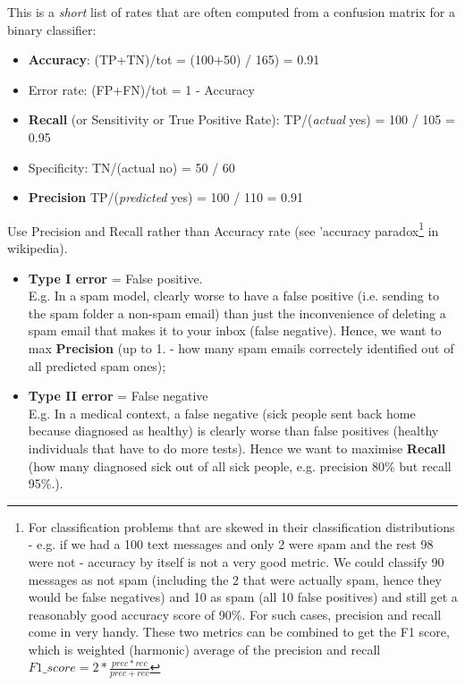 \documentclass[11pt]{article}
\begin{document}
This is a \textit{short} list of rates that are often computed from a confusion matrix for a binary classifier:
\begin{itemize}
	\item \textbf{Accuracy}: (TP+TN)/tot = (100+50) / 165) = 0.91
	\item Error rate: (FP+FN)/tot = 1 - Accuracy
	\item \textbf{Recall} (or Sensitivity or True Positive Rate): TP/(\textit{actual} yes) = 100 / 105 = 0.95
	\item Specificity: TN/(actual no) = 50 / 60
	\item \textbf{Precision} TP/(\textit{predicted} yes) = 100 / 110 = 0.91
\end{itemize}
Use Precision and Recall rather than Accuracy rate (see 'accuracy paradox\footnote{For classification problems that are skewed in their classification distributions - e.g. if we had a 100 text messages and only 2 were spam and the rest 98 were not - accuracy by itself is not a very good metric. We could classify 90 messages as not spam (including the 2 that were actually spam, hence they would be false negatives) and 10 as spam (all 10 false positives) and still get a reasonably good accuracy score of 90\%. For such cases, precision and recall come in very handy. These two metrics can be combined to get the F1 score, which is weighted (harmonic) average of the precision and recall $F1\_score = 2 * \frac{prec * rec}{prec + rec}$} in wikipedia).

\begin{itemize}
	\item \textbf{Type I error} = False positive. \\ E.g. In a spam model, clearly worse to have a false positive (i.e. sending to the spam folder a non-spam email) than just the inconvenience of deleting a spam email that makes it to your inbox (false negative). Hence, we want to max \textbf{Precision} (up to 1. - how many spam emails correctely identified out of all predicted spam ones);
	\item \textbf{Type II error} = False negative \\ E.g. In a medical context, a false negative (sick people sent back home because diagnosed as healthy) is clearly worse than false positives (healthy individuals that have to do more tests). Hence we want to maximise \textbf{Recall} (how many diagnosed sick out of all sick people, e.g. precision 80\% but recall 95\%.).
\end{itemize}
\end{document}
